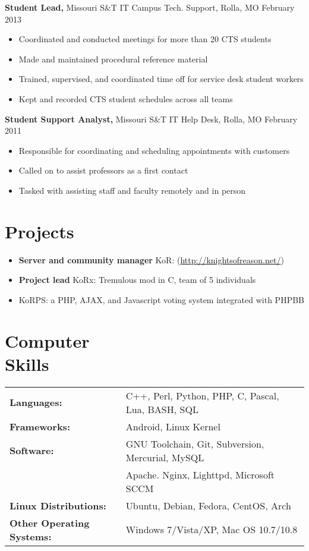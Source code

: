 \documentclass[margin]{res}
\begin{document}
\begin{resume}
 {\bf Student Lead,}  Missouri S\&T IT Campus Tech. Support, Rolla, MO \hfill February 2013
 \begin{itemize} \itemsep -1pt  %
 \item Coordinated and conducted meetings for more than 20 CTS students
 \item Made and maintained procedural reference material
 \item Trained, supervised, and coordinated time off for service desk student workers
 \item Kept and recorded CTS student schedules across all teams
 \end{itemize}
 
 {\bf Student Support Analyst,} Missouri S\&T IT Help Desk, Rolla, MO \hfill February 2011
 \begin{itemize} \itemsep -1pt  %
 \item Responsible for coordinating and scheduling appointments with customers
 \item Called on to assist professors as a first contact
 \item Tasked with assisting staff and faculty remotely and in person
 \end{itemize}

\section{Projects} 
\begin{itemize} \itemsep -1pt
\item {\bf Server and community manager} KoR: (\url{http://knightsofreason.net/})
\item {\bf Project lead} KoRx: Tremulous mod in C, team of 5 individuals
\item KoRPS: a PHP, AJAX, and Javascript voting system integrated with PHPBB
\end{itemize}

\section{Computer \\ Skills}
	\begin{tabular}{l p{3.6in}}
		{\bf Languages:} & C++, Perl, Python, PHP, C, Pascal, Lua, BASH, SQL \\ [1pt]
		{\bf Frameworks:} & Android, Linux Kernel \\ [1pt]
		{\bf Software:} & GNU Toolchain, Git, Subversion, Mercurial, MySQL \\
		& Apache. Nginx, Lighttpd, Microsoft SCCM \\ [1pt]
		{\bf Linux Distributions:} & Ubuntu, Debian, Fedora, CentOS, Arch \\ [1pt]
		{\bf Other Operating Systems:} & Windows 7/Vista/XP, Mac OS 10.7/10.8 \\ [1pt]
	\end{tabular}

\end{resume} 
\end{document}
